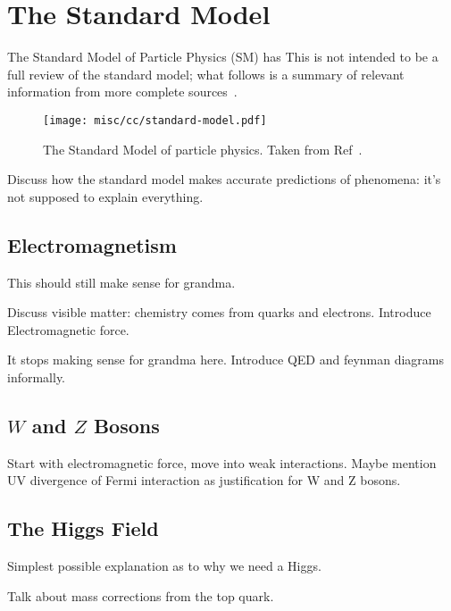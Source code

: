 \section{The Standard Model}
The Standard Model of Particle Physics (SM) has
This is not intended to be a full review of the standard model; what follows is a summary of relevant information from more complete sources~\cite{peskin}.
\begin{figure}
  \texttt{[image: misc/cc/standard-model.pdf]}
  \caption[The Standard Model of particle physics]{The Standard Model of particle physics. Taken from Ref~\cite{smwiki}.}
\end{figure}

Discuss how the standard model makes accurate predictions of phenomena: it's not supposed to explain everything.
\subsection{Electromagnetism}

This should still make sense for grandma.

Discuss visible matter: chemistry comes from quarks and electrons. Introduce Electromagnetic force.

It stops making sense for grandma here. Introduce QED and feynman diagrams informally.

\subsection{$W$ and $Z$ Bosons}
Start with electromagnetic force, move into weak interactions. Maybe mention UV divergence of Fermi interaction as justification for W and Z bosons.
\subsection{The Higgs Field}
Simplest possible explanation as to why we need a Higgs.

Talk about mass corrections from the top quark.
